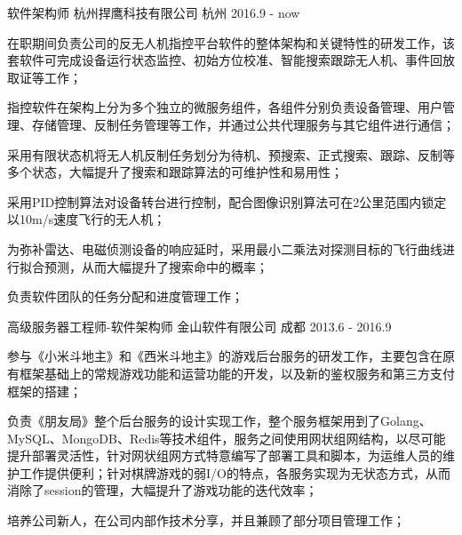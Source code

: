 

\begin{cventries}

  \cventry
    {软件架构师} %
    {杭州捍鹰科技有限公司} %
    {杭州} %
    {2016.9 - now} %
    {
      \begin{cvitems} %
        \item {在职期间负责公司的反无人机指控平台软件的整体架构和关键特性的研发工作，该套软件可完成设备运行状态监控、初始方位校准、智能搜索跟踪无人机、事件回放取证等工作；}
        \item {指控软件在架构上分为多个独立的微服务组件，各组件分别负责设备管理、用户管理、存储管理、反制任务管理等工作，并通过公共代理服务与其它组件进行通信；}
        \item {采用有限状态机将无人机反制任务划分为待机、预搜索、正式搜索、跟踪、反制等多个状态，大幅提升了搜索和跟踪算法的可维护性和易用性；}
        \item {采用PID控制算法对设备转台进行控制，配合图像识别算法可在2公里范围内锁定以10m/s速度飞行的无人机；}
        \item {为弥补雷达、电磁侦测设备的响应延时，采用最小二乘法对探测目标的飞行曲线进行拟合预测，从而大幅提升了搜索命中的概率；}
        \item {负责软件团队的任务分配和进度管理工作；}
      \end{cvitems}
    }

  \cventry
    {高级服务器工程师-软件架构师} %
    {金山软件有限公司} %
    {成都} %
    {2013.6 - 2016.9} %
    {
      \begin{cvitems} %
        \item {参与《小米斗地主》和《西米斗地主》的游戏后台服务的研发工作，主要包含在原有框架基础上的常规游戏功能和运营功能的开发，以及新的鉴权服务和第三方支付框架的搭建；}
        \item {负责《朋友局》整个后台服务的设计实现工作，整个服务框架用到了Golang、MySQL、MongoDB、Redis等技术组件，服务之间使用网状组网结构，以尽可能提升部署灵活性，针对网状组网方式特意编写了部署工具和脚本，为运维人员的维护工作提供便利；针对棋牌游戏的弱I/O的特点，各服务实现为无状态方式，从而消除了session的管理，大幅提升了游戏功能的迭代效率；}
        \item {培养公司新人，在公司内部作技术分享，并且兼顾了部分项目管理工作；}
      \end{cvitems}
    }


\end{cventries}
